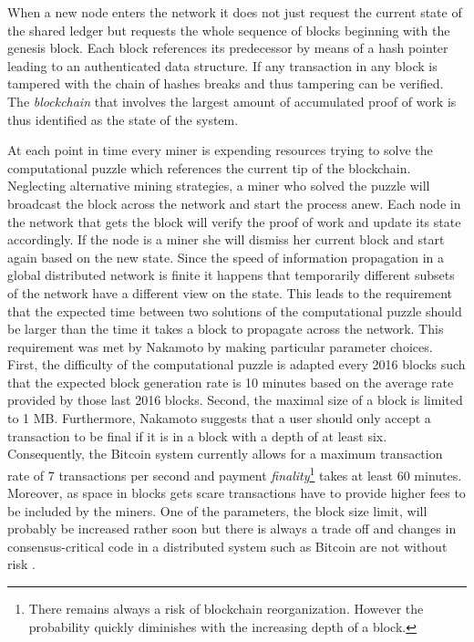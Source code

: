 \documentclass[10pt,journal,compsoc]{IEEEtran}
\begin{document}
When a new node enters the network it does not just request the current state of the shared ledger but requests the whole sequence of blocks beginning with the genesis block. Each block references its predecessor by means of a hash pointer leading to an authenticated data structure. If any transaction in any block is tampered with the chain of hashes breaks and thus tampering can be verified. The \emph{blockchain} that involves the largest amount of accumulated proof of work is thus identified as the  state of the system.

At each point in time every miner is expending resources trying to solve the computational puzzle which references the current tip of the blockchain. Neglecting alternative mining strategies, a miner who solved the puzzle will broadcast the block across the network and start the process anew. Each node in the network that gets the block will verify the proof of work and update its state accordingly. If the node is a miner she will dismiss her current block and start again based on the new state. Since the speed of information propagation in a global distributed network is finite it happens that temporarily different subsets of the network have a different view on the state. This leads to the requirement that the expected time between two solutions of the computational puzzle should be larger than the time it takes a block to propagate across the network. This requirement was met by Nakamoto by making particular parameter choices. First, the difficulty of the computational puzzle is adapted every 2016 blocks such that the expected block generation rate is 10 minutes based on the average rate provided by those last 2016 blocks. Second, the maximal size of a block is limited to 1 MB. Furthermore, Nakamoto suggests that a user should only accept a transaction to be final if it is in a block with a depth of at least six. Consequently, the Bitcoin system currently allows for a maximum transaction rate of 7 transactions per second and payment \emph{finality}\footnote{There remains always a risk of blockchain reorganization. However the probability quickly diminishes with the increasing depth of a block. } takes at least 60 minutes. Moreover, as space in blocks gets scare transactions have to provide higher fees to be included by the miners. One of the parameters, the block size limit, will probably be increased rather soon but there is always a trade off and changes in consensus-critical code in a distributed system such as Bitcoin are not without risk \cite{croman2016scaling}.
\end{document}
